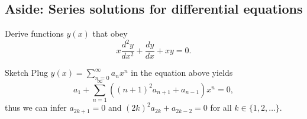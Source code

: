 
\subsection*{Aside: Series solutions for differential equations}

\begin{que}{}{}
  Derive functions \(y(x)\) that obey  \[
    x\frac{d^2y}{dx^2} + \frac{dy}{dx} + xy = 0.
  \] 
\end{que}

\begin{dem}{Sketch}{}
  Plug \(y(x) = \sum_{n=0}^{\infty} a_nx^n\) in the equation above yields \[
    a_1 + \sum_{n=1}^\infty \left((n+1)^2a_{n+1} + a_{n-1}\right)x^n = 0,
  \]
  thus we can infer \(a_{2k+1} = 0\) and \((2k)^2a_{2k} + a_{2k-2} = 0\) for all \(k \in \{1, 2, \dots\}\).
\end{dem}

